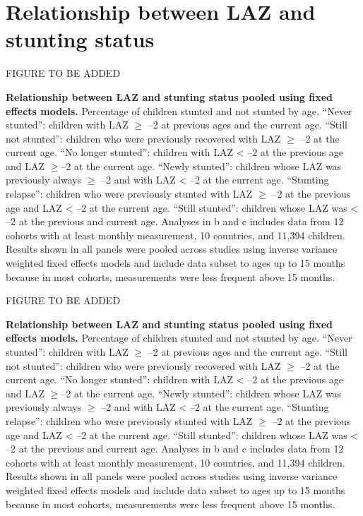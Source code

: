 \documentclass[9pt,]{book}
\begin{document}
\hypertarget{relationship-between-laz-and-stunting-status}{%
\section{Relationship between LAZ and stunting status}\label{relationship-between-laz-and-stunting-status}}

FIGURE TO BE ADDED

\textbf{Relationship between LAZ and stunting status pooled using fixed effects models.} Percentage of children stunted and not stunted by age. ``Never stunted'': children with LAZ \(\ge\) --2 at previous ages and the current age. ``Still not stunted'': children who were previously recovered with LAZ \(\ge\) --2 at the current age. ``No longer stunted'': children with LAZ \textless{} --2 at the previous age and LAZ \(\ge\)--2 at the current age. ``Newly stunted'': children whose LAZ was previously always \(\ge\) --2 and with LAZ \textless{} --2 at the current age. ``Stunting relapse'': children who were previously stunted with LAZ \(\ge\) --2 at the previous age and LAZ \textless{} --2 at the current age. ``Still stunted'': children whose LAZ was \textless{} --2 at the previous and current age. Analyses in b and c includes data from 12 cohorts with at least monthly measurement, 10 countries, and 11,394 children. Results shown in all panels were pooled across studies using inverse variance weighted fixed effects models and include data subset to ages up to 15 months because in most cohorts, measurements were less frequent above 15 months.

FIGURE TO BE ADDED

\textbf{Relationship between LAZ and stunting status pooled using fixed effects models.} Percentage of children stunted and not stunted by age. ``Never stunted'': children with LAZ \(\ge\) --2 at previous ages and the current age. ``Still not stunted'': children who were previously recovered with LAZ \(\ge\) --2 at the current age. ``No longer stunted'': children with LAZ \textless{} --2 at the previous age and LAZ \(\ge\)--2 at the current age. ``Newly stunted'': children whose LAZ was previously always \(\ge\) --2 and with LAZ \textless{} --2 at the current age. ``Stunting relapse'': children who were previously stunted with LAZ \(\ge\) --2 at the previous age and LAZ \textless{} --2 at the current age. ``Still stunted'': children whose LAZ was \textless{} --2 at the previous and current age. Analyses in b and c includes data from 12 cohorts with at least monthly measurement, 10 countries, and 11,394 children. Results shown in all panels were pooled across studies using inverse variance weighted fixed effects models and include data subset to ages up to 15 months because in most cohorts, measurements were less frequent above 15 months.
\end{document}
